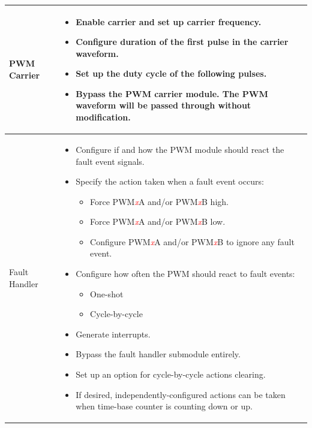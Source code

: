 \begin{longtable}[c]{|m{5cm}|m{10cm}|}
    PWM Carrier &\vspace{-1em}
    \begin{itemize}
        \item Enable carrier and set up carrier frequency.
        \item Configure duration of the first pulse in the carrier waveform.
        \item Set up the duty cycle of the following pulses.
        \item Bypass the PWM carrier module. The PWM waveform will be passed through without modification.\vspace{-1em}
    \end{itemize}\\\hline
    
    Fault Handler &
    \begin{itemize} \vspace{-1em}   
        \item Configure if and how the PWM module should react the fault event signals.
        \item Specify the action taken when a fault event occurs:
        \begin{itemize}
            \item Force PWM\textcolor{red}{\it{x}}A and/or PWM\textcolor{red}{\it{x}}B high.
            \item Force PWM\textcolor{red}{\it{x}}A and/or PWM\textcolor{red}{\it{x}}B low.
            \item Configure PWM\textcolor{red}{\it{x}}A and/or PWM\textcolor{red}{\it{x}}B to ignore any fault event.
        \end{itemize}
        \item Configure how often the PWM should react to fault events:
        \begin{itemize}
            \item One-shot
            \item Cycle-by-cycle
        \end{itemize}
        \item Generate interrupts.
        \item Bypass the fault handler submodule entirely.
        \item Set up an option for cycle-by-cycle actions clearing.
        \item If desired, independently-configured actions can be taken when time-base counter is counting down or up.\vspace{-1em}

    \end{itemize}\\\hline
    
\end{longtable}
